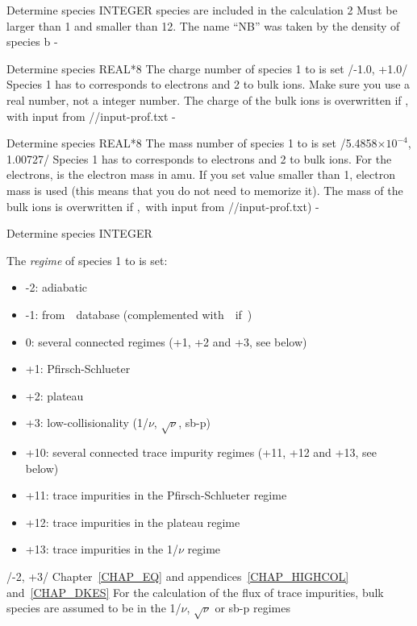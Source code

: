 {
{Determine species}
{INTEGER}
{ species are included in the calculation}
{2}%
{Must be larger than 1 and smaller than 12. The name ``NB'' was taken by the density of species b}
{-}

{Determine species}
{REAL*8}
{The charge number of species 1 to  is set}
{/-1.0, +1.0/}%
{Species 1 has to corresponds to electrons and 2 to bulk ions. Make sure you use a real number, not a integer number. The charge of the bulk ions is overwritten if , with input from {\ttfamily //input-prof.txt}}
{-}

{Determine species}
{REAL*8}
{The mass number of species 1 to  is set}
{/5.4858$\times 10^{-4}$, 1.00727/}%
{Species 1 has to corresponds to electrons and 2 to bulk ions. For the electrons,  is the electron mass in amu. If you set  value smaller than 1, electron mass is used (this means that you do not need to memorize it). The mass of the bulk ions is overwritten if ,~with input from {\ttfamily //input-prof.txt})}
{-}

{Determine species}
{INTEGER}
{The \textit{regime} of species 1 to  is set:
\begin{itemize}
\item  -2: adiabatic
\item  -1: from~\DKES~database (complemented with~\KNOSOS~if~)
\item   0: several connected regimes (+1, +2 and +3, see below)
\item  +1: Pfirsch-Schlueter
\item  +2: plateau
\item  +3: low-collisionality (1/$\nu$, $\sqrt{\nu}$, sb-p)
\item +10: several connected trace impurity regimes (+11, +12 and +13, see below)
\item +11: trace impurities in the Pfirsch-Schlueter regime
\item +12: trace impurities in the plateau regime
\item +13: trace impurities in the 1/$\nu$ regime
\end{itemize}}
{/-2, +3/}
{Chapter~\ref{CHAP_EQ} and appendices~\ref{CHAP_HIGHCOL} and~\ref{CHAP_DKES}} 
{For the calculation of the flux of  trace impurities, bulk species are assumed to be in the 1/$\nu$, $\sqrt{\nu}$ or sb-p regimes}

}

